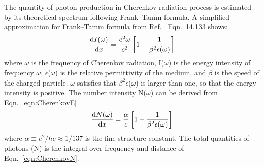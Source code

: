 The quantity of photon production in Cherenkov radiation process is estimated by its theoretical spectrum following Frank–Tamm formula. A simplified approximation for Frank–Tamm formula from Ref.~\cite{Jackson1999} Eqn.~{14.133} shows:
\begin{align}
	\frac{\operatorname{d}\!{I}(\omega)}{\operatorname{d}\!{x}} = \frac{e^2 \omega}{c^2} \left[ 1-\frac{1}{\beta^2 \epsilon(\omega)} \right] 
	\label{eqn:CherenkovE}
\end{align}
where $\omega$ is the frequency of Cherenkov radiation, I($\omega$) is the energy intensity of frequency $\omega$, $\epsilon$($\omega$) is the relative permittivity of the medium, and $\beta$ is the speed of the charged particle. 
$\omega$ satisfies that $\beta^2 \epsilon$($\omega$) is larger than one, so that the energy intensity is positive.
The number intensity N($\omega$) can be derived from Eqn.~\ref{eqn:CherenkovE}
\begin{align}
	\frac{\operatorname{d}\!{N}(\omega)}{\operatorname{d}\!{x}} = \frac{\alpha}{c} \left[1-\frac{1}{\beta^2 \epsilon(\omega)} \right] 
	\label{eqn:CherenkovN}
\end{align}
where $\alpha \equiv e^2/\hbar c \approx 1/137$ is the fine structure constant. The total quantities of photons (N) is the integral over frequency and distance of Eqn.~\ref{eqn:CherenkovN}.


